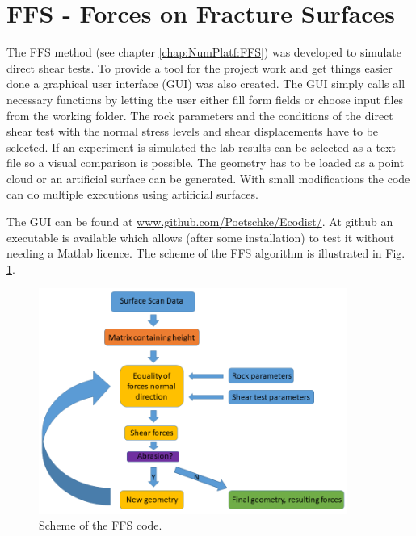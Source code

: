 \section{FFS - Forces on Fracture Surfaces}
The FFS method (see chapter \ref{chap:NumPlatf:FFS}) was developed to simulate direct shear tests. To provide a tool for the project work and get things easier done a graphical user interface (GUI) was also created. The GUI simply calls all necessary functions by letting the user either fill form fields or choose input files from the working folder. The rock parameters and the conditions of the direct shear test with the normal stress levels and shear displacements have to be selected. If an experiment is simulated the lab results can be selected as a text file so a visual comparison is possible. The geometry has to be loaded as a point cloud or an artificial surface can be generated. With small modifications the code can do multiple executions using artificial surfaces.

The GUI can be found at \url{www.github.com/Poetschke/Ecodist/}. At github an executable is available which allows (after some installation) to test it without needing a Matlab licence.
The scheme of the FFS algorithm is illustrated in Fig. \ref{fig:AppendixFFSFigure}.

\begin{figure}[htp!]
\centering
\includegraphics[width=0.9\textwidth]{figures/MEX7_Scheme.png}
\caption{Scheme of the FFS code.}
\label{fig:AppendixFFSFigure}
\end{figure}
